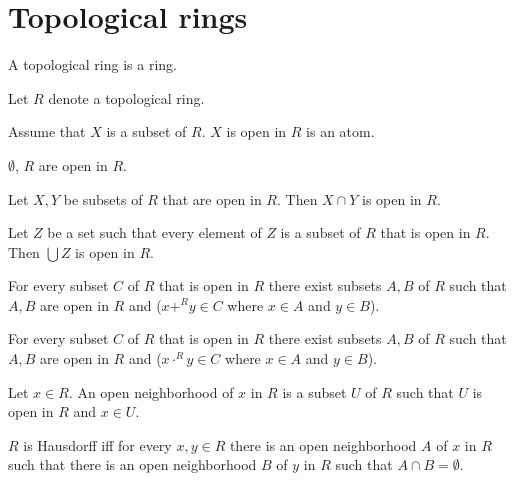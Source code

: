 \documentclass{article}
\begin{document}
\section{Topological rings}

\begin{forthel}
  \begin{signature}
    A topological ring is a ring.
  \end{signature}

  Let $R$ denote a topological ring.

  \begin{signature}
    Assume that $X$ is a subset of $R$.
    $X$ is open in $R$ is an atom.
  \end{signature}

  \begin{axiom}
    $\emptyset$, $R$ are open in $R$.
  \end{axiom}

  \begin{axiom}
    Let $X,Y$ be subsets of $R$ that are open in $R$.
    Then $X \cap Y$ is open in $R$.
  \end{axiom}

  \begin{axiom}
    Let $Z$ be a set such that every element of $Z$ is a subset of $R$ that is open in $R$.
    Then $\bigcup Z$ is open in $R$.
  \end{axiom}

  \begin{axiom}
    For every subset $C$ of $R$ that is open in $R$ there exist subsets $A,B$ of $R$ such that
    $A,B$ are open in $R$ and ($x +^{R} y \in C$ where  $x \in A$ and $y \in B$).
  \end{axiom}

  \begin{axiom}
    For every subset $C$ of $R$ that is open in $R$ there exist subsets $A,B$ of $R$ such that
    $A,B$ are open in $R$ and ($x \cdot^{R} y \in C$ where $x \in A$ and $y \in B$).
  \end{axiom}

  \begin{definition}
    Let $x \in R$.
    An open neighborhood of $x$ in $R$ is a subset $U$ of $R$ such that $U$ is open in $R$ and $x \in U$.
  \end{definition}

  \begin{definition}
    $R$ is Hausdorff iff for every $x,y \in R$ there is an open neighborhood $A$ of $x$ in $R$ such that
    there is an open neighborhood $B$ of $y$ in $R$ such that $A \cap B = \emptyset$.
  \end{definition}


\end{forthel}
\end{document}
